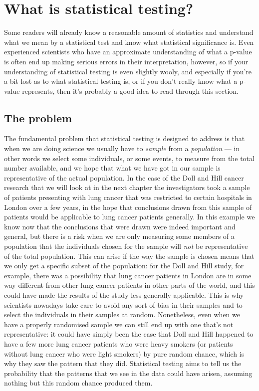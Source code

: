 \documentclass[
]{book}
\begin{document}
\hypertarget{what-is-statistical-testing}{%
\chapter{What is statistical testing?}\label{what-is-statistical-testing}}

Some readers will already know a reasonable amount of statistics and understand what we mean by a statistical test and know what statistical significance is. Even experienced scientists who have an approximate understanding of what a p-value is often end up making serious errors in their interpretation, however, so if your understanding of statistical testing is even slightly wooly, and especially if you're a bit lost as to what statistical testing is, or if you don't really know what a p-value represents, then it's probably a good idea to read through this section.

\hypertarget{the-problem}{%
\section{The problem}\label{the-problem}}

The fundamental problem that statistical testing is designed to address is that when we are doing science we usually have to \emph{sample} from a \emph{population} --- in other words we select some individuals, or some events, to measure from the total number available, and we hope that what we have got in our sample is representative of the actual population. In the case of the Doll and Hill cancer research that we will look at in the next chapter the investigators took a sample of patients presenting with lung cancer that was restricted to certain hospitals in London over a few years, in the hope that conclusions drawn from this sample of patients would be applicable to lung cancer patients generally. In this example we know now that the conclusions that were drawn were indeed important and general, but there is a risk when we are only measuring some members of a population that the individuals chosen for the sample will \emph{not} be representative of the total population. This can arise if the way the sample is chosen means that we only get a specific subset of the population: for the Doll and Hill study, for example, there was a possibility that lung cancer patients in London are in some way different from other lung cancer patients in other parts of the world, and this could have made the results of the study less generally applicable. This is why scientists nowadays take care to avoid any sort of bias in their samples and to select the individuals in their samples at random. Nonetheless, even when we have a properly randomised sample we can still end up with one that's not representative: it could have simply been the case that Doll and Hill happened to have a few more lung cancer patients who were heavy smokers (or patients without lung cancer who were light smokers) by pure random chance, which is why they saw the pattern that they did. Statistical testing aims to tell us the probability that the patterns that we see in the data could have arisen, assuming nothing but this random chance produced them.
\end{document}
